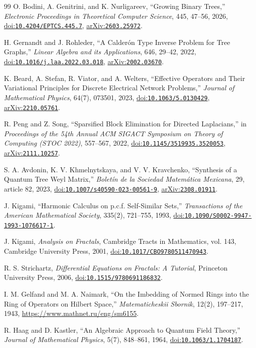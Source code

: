 \documentclass[11pt]{article}
\theoremstyle{remark}
\newcommand{\doi}[1]{\href{https://doi.org/#1}{doi:\nolinkurl{#1}}}
\newcommand{\arxivref}[1]{\href{https://arxiv.org/abs/#1}{arXiv:\nolinkurl{#1}}}
\numberwithin{equation}{section}
\begin{document}
\begin{thebibliography}{99}
O. Bodini, A. Genitrini, and K. Nurligareev,
``Growing Binary Trees,''
\emph{Electronic Proceedings in Theoretical Computer Science},
445, 47--56, 2026,
\doi{10.4204/EPTCS.445.7},
\arxivref{2603.25972}.

H. Gernandt and J. Rohleder,
``A Calder\'on Type Inverse Problem for Tree Graphs,''
\emph{Linear Algebra and its Applications},
646, 29--42, 2022,
\doi{10.1016/j.laa.2022.03.018},
\arxivref{2002.03670}.

K. Beard, A. Stefan, R. Viator, and A. Welters,
``Effective Operators and Their Variational Principles for Discrete Electrical Network Problems,''
\emph{Journal of Mathematical Physics},
64(7), 073501, 2023,
\doi{10.1063/5.0130429},
\arxivref{2210.05761}.

R. Peng and Z. Song,
``Sparsified Block Elimination for Directed Laplacians,''
in \emph{Proceedings of the 54th Annual ACM SIGACT Symposium on Theory of Computing (STOC 2022)},
557--567, 2022,
\doi{10.1145/3519935.3520053},
\arxivref{2111.10257}.

S. A. Avdonin, K. V. Khmelnytskaya, and V. V. Kravchenko,
``Synthesis of a Quantum Tree Weyl Matrix,''
\emph{Bolet\'in de la Sociedad Matem\'atica Mexicana},
29, article 82, 2023,
\doi{10.1007/s40590-023-00561-9},
\arxivref{2308.01911}.

J. Kigami,
``Harmonic Calculus on p.c.f. Self-Similar Sets,''
\emph{Transactions of the American Mathematical Society},
335(2), 721--755, 1993,
\doi{10.1090/S0002-9947-1993-1076617-1}.

J. Kigami,
\emph{Analysis on Fractals},
Cambridge Tracts in Mathematics, vol. 143,
Cambridge University Press, 2001,
\doi{10.1017/CBO9780511470943}.

R. S. Strichartz,
\emph{Differential Equations on Fractals: A Tutorial},
Princeton University Press, 2006,
\doi{10.1515/9780691186832}.

I. M. Gelfand and M. A. Naimark,
``On the Imbedding of Normed Rings into the Ring of Operators on Hilbert Space,''
\emph{Matematicheskii Sbornik},
12(2), 197--217, 1943,
\url{https://www.mathnet.ru/eng/sm6155}.

R. Haag and D. Kastler,
``An Algebraic Approach to Quantum Field Theory,''
\emph{Journal of Mathematical Physics},
5(7), 848--861, 1964,
\doi{10.1063/1.1704187}.


\end{thebibliography}
\end{document}
